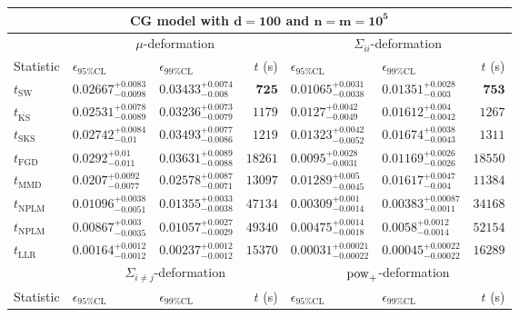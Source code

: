 \begin{tabular}{l|llr|llr}
	\toprule
	\multicolumn{7}{c}{{\bf CG model with $\mathbf{d=100}$ and $\mathbf{n=m=10^{5}}$}} \\
	\toprule
	\multicolumn{1}{c}{} & \multicolumn{3}{c}{$\mu$-deformation} & \multicolumn{3}{c}{$\Sigma_{ii}$-deformation} \\
	Statistic & $\epsilon_{95\%\mathrm{CL}}$ & $\epsilon_{99\%\mathrm{CL}}$ & $t$ (s) & $\epsilon_{95\%\mathrm{CL}}$ & $\epsilon_{99\%\mathrm{CL}}$ & $t$ (s) \\
	\midrule
	$t_{\mathrm{SW}}$ & $0.02667_{-0.0098}^{+0.0083}$ & $0.03433_{-0.008}^{+0.0074}$ & ${\mathbf{725}}$ & $0.01065_{-0.0038}^{+0.0031}$ & $0.01351_{-0.003}^{+0.0028}$ & ${\mathbf{753}}$ \\
	$t_{\overline{\mathrm{KS}}}$ & $0.02531_{-0.0089}^{+0.0078}$ & $0.03236_{-0.0079}^{+0.0073}$ & $1179$ & $0.0127_{-0.0049}^{+0.0042}$ & $0.01612_{-0.0042}^{+0.004}$ & $1267$ \\
	$t_{\mathrm{SKS}}$ & $0.02742_{-0.01}^{+0.0084}$ & $0.03493_{-0.0086}^{+0.0077}$ & $1219$ & $0.01323_{-0.0052}^{+0.0042}$ & $0.01674_{-0.0043}^{+0.0038}$ & $1311$ \\
	$t_{\mathrm{FGD}}$ & $0.0292_{-0.011}^{+0.01}$ & $0.03631_{-0.0088}^{+0.0089}$ & $18261$ & ${\mathbf{0.0095_{-0.0031}^{+0.0028}}}$ & ${\mathbf{0.01169_{-0.0026}^{+0.0026}}}$ & $18550$ \\
	$t_{\mathrm{MMD}}$ & ${\mathbf{0.0207_{-0.0077}^{+0.0092}}}$ & ${\mathbf{0.02578_{-0.0071}^{+0.0087}}}$ & $13097$ & $0.01289_{-0.0045}^{+0.005}$ & $0.01617_{-0.004}^{+0.0047}$ & $11384$ \\
\rowcolor{red!35}	$t_{\mathrm{NPLM}}$ & $0.01096_{-0.0051}^{+0.0038}$ & $0.01355_{-0.0038}^{+0.0033}$ & $47134$ & $0.00309_{-0.0014}^{+0.001}$ & $0.00383_{-0.0011}^{+0.00087}$ & $34168$ \\
\rowcolor{blue!35}	$t_{\mathrm{NPLM}}$ & $0.00867_{-0.0035}^{+0.003}$ & $0.01057_{-0.0029}^{+0.0027}$ & $49340$ & $0.00475_{-0.0018}^{+0.0014}$ & $0.0058_{-0.0014}^{+0.0012}$ & $52154$ \\
	$t_{\mathrm{LLR}}$ & $0.00164_{-0.0012}^{+0.0012}$ & $0.00237_{-0.0012}^{+0.0012}$ & $15370$ & $0.00031_{-0.00022}^{+0.00021}$ & $0.00045_{-0.00022}^{+0.00022}$ & $16289$ \\
	\toprule
	\multicolumn{1}{c}{} & \multicolumn{3}{c}{$\Sigma_{i\neq j}$-deformation} & \multicolumn{3}{c}{$\rm{pow}_{+}$-deformation} \\
	Statistic & $\epsilon_{95\%\mathrm{CL}}$ & $\epsilon_{99\%\mathrm{CL}}$ & $t$ (s) & $\epsilon_{95\%\mathrm{CL}}$ & $\epsilon_{99\%\mathrm{CL}}$ & $t$ (s) \\

\end{tabular}
